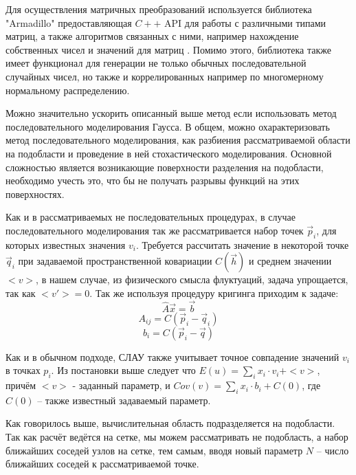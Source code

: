 Для осуществления матричных преобразований используется библиотека "Armadillo" предоставляющая $C++$ API для работы с различными типами матриц, а также алгоритмов связанных с ними, например нахождение собственных чисел и значений для матриц \cite{sanderson2016armadillo, sanderson2018user}. Помимо этого, библиотека также имеет функционал для генерации не только обычных последовательной случайных чисел, но также и коррелированных например по многомерному нормальному распределению.

Можно значительно ускорить описанный выше метод если использовать метод последовательного моделирования Гаусса. В общем, можно охарактеризовать метод последовательного моделирования, как разбиения рассматриваемой области на подобласти и проведение в ней стохастического моделирования. Основной сложностью является возникающие поверхности разделения на подобласти, необходимо учесть это, что бы не получать разрывы функций на этих поверхностях. 

Как и в рассматриваемых не последовательных процедурах, в случае последовательного моделирования так же рассматривается набор точек $\vec p_i$, для которых известных значения $v_i$. Требуется рассчитать значение в некоторой точке $\vec q_i$ при задаваемой пространственной ковариации $C(\vec h)$ и среднем значении $<v>$, в нашем случае, из физического смысла флуктуаций, задача упрощается, так как $<v'>=0$. Так же используя процедуру кригинга приходим к задаче:
\begin{equation}
    \label{eq:kriging_seq_1}
    \hat{A} \vec x = \vec b
\end{equation}
\begin{equation}
    \label{eq:kriging_seq_2}
    A_{ij} = C(\vec p_i - \vec q_i)
\end{equation}
\begin{equation}
    \label{eq:kriging_seq_3}
    b_i = C(\vec p_i - \vec q)
\end{equation}

Как и в обычном подходе, СЛАУ также учитывает точное совпадение значений $v_i$ в точках $p_i$. Из постановки выше следует что $E(u) = \sum_{i} x_i \cdot v_i + <v>$, причём $<v>$ - заданный параметр, и $Cov(v) = \sum_{i} x_i \cdot b_i + C(0)$, где $C(0)$ -- также известный задаваемый параметр.

Как говорилось выше, вычислительная область подразделяется на подобласти. Так как расчёт ведётся на сетке, мы можем рассматривать не подобласть, а набор ближайших соседей узлов на сетке, тем самым, вводя новый параметр $N$ -- число ближайших соседей к рассматриваемой точке.

